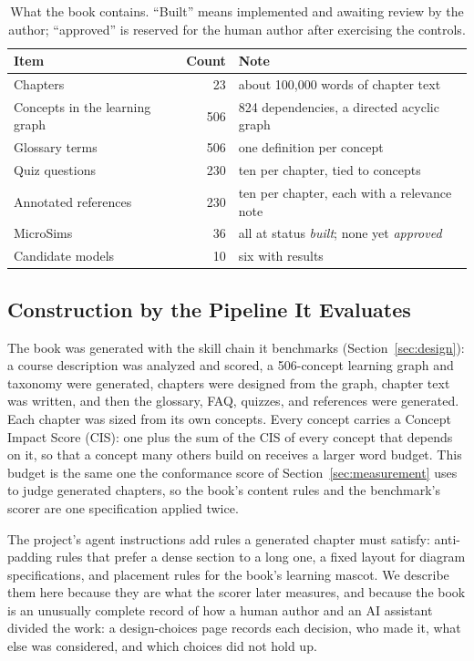 \begin{table}[htbp]
\centering
\small
\begin{tabular}{@{}lrl@{}}
\toprule
\textbf{Item} & \textbf{Count} & \textbf{Note} \\
\midrule
Chapters & 23 & about 100,000 words of chapter text \\
Concepts in the learning graph & 506 & 824 dependencies, a directed acyclic graph \\
Glossary terms & 506 & one definition per concept \\
Quiz questions & 230 & ten per chapter, tied to concepts \\
Annotated references & 230 & ten per chapter, each with a relevance note \\
MicroSims & 36 & all at status \textit{built}; none yet \textit{approved} \\
Candidate models & 10 & six with results \\
\bottomrule
\end{tabular}
\caption{What the book contains. ``Built'' means implemented and awaiting review by the author; ``approved'' is reserved for the human author after exercising the controls.}
\label{tab:inventory}
\end{table}

\subsection{Construction by the Pipeline It Evaluates}

The book was generated with the skill chain it benchmarks (Section~\ref{sec:design}): a course description was analyzed and scored, a 506-concept learning graph and taxonomy were generated, chapters were designed from the graph, chapter text was written, and then the glossary, FAQ, quizzes, and references were generated. Each chapter was sized from its own concepts. Every concept carries a Concept Impact Score (CIS): one plus the sum of the CIS of every concept that depends on it, so that a concept many others build on receives a larger word budget. This budget is the same one the conformance score of Section~\ref{sec:measurement} uses to judge generated chapters, so the book's content rules and the benchmark's scorer are one specification applied twice.

The project's agent instructions add rules a generated chapter must satisfy: anti-padding rules that prefer a dense section to a long one, a fixed layout for diagram specifications, and placement rules for the book's learning mascot. We describe them here because they are what the scorer later measures, and because the book is an unusually complete record of how a human author and an AI assistant divided the work: a design-choices page records each decision, who made it, what else was considered, and which choices did not hold up.

